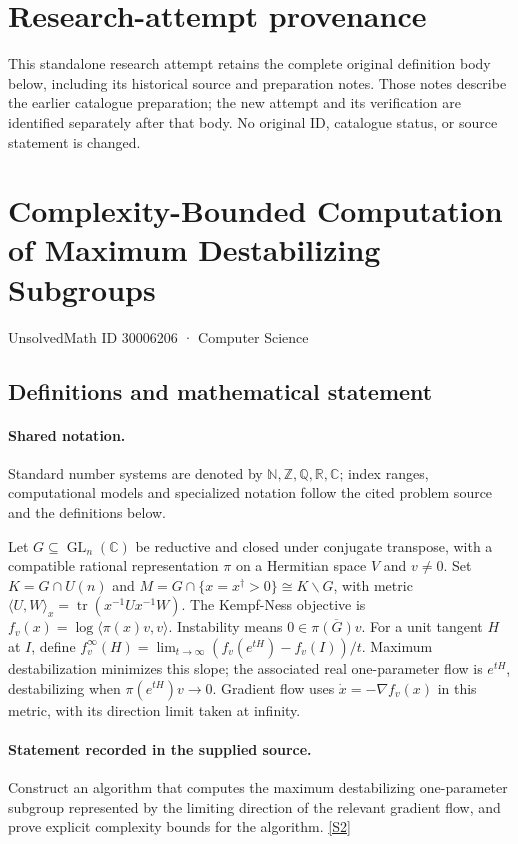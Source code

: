 \documentclass[11pt]{article}
\begin{document}
\section*{Research-attempt provenance}
This standalone research attempt retains the complete original definition body below,
including its historical source and preparation notes. Those notes describe the
earlier catalogue preparation; the new attempt and its verification are identified
separately after that body. No original ID, catalogue status, or source statement is changed.

\section{Complexity-Bounded Computation of Maximum Destabilizing Subgroups}\label{30006206}
{\small UnsolvedMath ID 30006206 · Computer Science}
\subsection{Definitions and mathematical statement}

\paragraph{Shared notation.}Standard number systems are denoted by $\mathbb N,\mathbb Z,\mathbb Q,\mathbb R,\mathbb C$; index ranges, computational models and specialized notation follow the cited problem source and the definitions below.


Let $G\subseteq\operatorname{GL}_n(\mathbb C)$ be reductive and closed under conjugate transpose, with a compatible rational representation $\pi$ on a Hermitian space $V$ and $v\ne0$. Set $K=G\cap U(n)$ and $M=G\cap\{x=x^\dagger>0\}\cong K\backslash G$, with metric $\langle U,W\rangle_x=\operatorname{tr}(x^{-1}Ux^{-1}W)$. The Kempf-Ness objective is $f_v(x)=\log\langle\pi(x)v,v\rangle$. Instability means $0\in\overline{\pi(G)v}$. For a unit tangent $H$ at $I$, define $f_v^\infty(H)=\lim_{t\to\infty}(f_v(e^{tH})-f_v(I))/t$. Maximum destabilization minimizes this slope; the associated real one-parameter flow is $e^{tH}$, destabilizing when $\pi(e^{tH})v\to0$. Gradient flow uses $\dot x=-\nabla f_v(x)$ in this metric, with its direction limit taken at infinity.
\paragraph{Statement recorded in the supplied source.}
Construct an algorithm that computes the maximum destabilizing one-parameter subgroup represented by the limiting direction of the relevant gradient flow, and prove explicit complexity bounds for the algorithm. \href{https://doi.org/10.4171/owr/2025/9}{[S2]}
\end{document}
